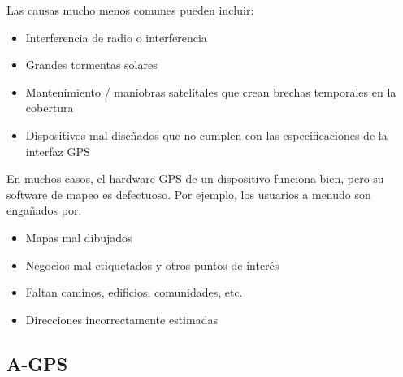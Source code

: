 Las causas mucho menos comunes pueden incluir:
\begin{itemize}
	\item Interferencia de radio o interferencia
	\item Grandes tormentas solares
	\item Mantenimiento / maniobras satelitales que crean brechas temporales en la cobertura
	\item Dispositivos mal diseñados que no cumplen con las especificaciones de la interfaz GPS
\end{itemize}

En muchos casos, el hardware GPS de un dispositivo funciona bien, pero su software de mapeo es defectuoso. Por ejemplo, los usuarios a menudo son engañados por:
\begin{itemize}
	\item Mapas mal dibujados
	\item Negocios mal etiquetados y otros puntos de interés
	\item Faltan caminos, edificios, comunidades, etc.
	\item Direcciones incorrectamente estimadas
\end{itemize}


\subsection{A-GPS}





